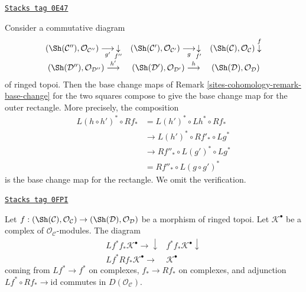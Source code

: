 \begin{remark}
\label{sites-cohomology-remark-compose-base-change-horizontal}
\href{https://stacks.math.columbia.edu/tag/0E47}{\texttt{Stacks tag 0E47}}

Consider a commutative diagram
$$
\begin{array}{ccc}(\Sh(\mathcal{C}''), \mathcal{O}_{\mathcal{C}''})
\underset{g'}{\longrightarrow}\underset{f''}{\downarrow} & (\Sh(\mathcal{C}'), \mathcal{O}_{\mathcal{C}'})
\underset{g}{\longrightarrow}\underset{f'}{\downarrow} & (\Sh(\mathcal{C}), \mathcal{O}_\mathcal{C}) \overset{f}{\downarrow} \\ (\Sh(\mathcal{D}''), \mathcal{O}_{\mathcal{D}''})
\overset{h'}{\longrightarrow} & (\Sh(\mathcal{D}'), \mathcal{O}_{\mathcal{D}'})
\overset{h}{\longrightarrow} & (\Sh(\mathcal{D}), \mathcal{O}_\mathcal{D})\end{array}
$$
of ringed topoi. Then the base change maps of
Remark \ref{sites-cohomology-remark-base-change}
for the two squares compose to give the base
change map for the outer rectangle. More precisely,
the composition
\begin{align*}
L(h \circ h')^* \circ Rf_*
& =
L(h')^* \circ Lh^* \circ Rf_* \\
& \to L(h')^* \circ Rf'_* \circ Lg^* \\
& \to Rf''_* \circ L(g')^* \circ Lg^* \\
& = Rf''_* \circ L(g \circ g')^*
\end{align*}
is the base change map for the rectangle. We omit the verification.
\end{remark}


\begin{lemma}
\label{sites-cohomology-lemma-adjoints-push-pull-compatibility}
\href{https://stacks.math.columbia.edu/tag/0FPI}{\texttt{Stacks tag 0FPI}}

Let $f : (\Sh(\mathcal{C}), \mathcal{O}_\mathcal{C}) \to
(\Sh(\mathcal{D}), \mathcal{O}_\mathcal{D})$ be a morphism of ringed topoi.
Let $\mathcal{K}^\bullet$
be a complex of $\mathcal{O}_\mathcal{C}$-modules.
The diagram
$$
\begin{array}{cc}Lf^*f_*\mathcal{K}^\bullet \longrightarrow\downarrow & f^*f_*\mathcal{K}^\bullet \downarrow \\ Lf^*Rf_*\mathcal{K}^\bullet \longrightarrow & \mathcal{K}^\bullet\end{array}
$$
coming from $Lf^* \to f^*$ on complexes, $f_* \to Rf_*$ on complexes,
and adjunction $Lf^* \circ Rf_* \to \text{id}$
commutes in $D(\mathcal{O}_\mathcal{C})$.
\end{lemma}

